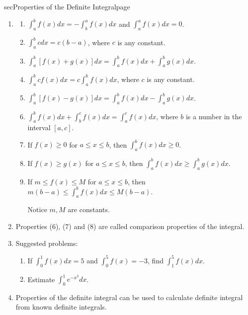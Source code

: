 \documentclass[../main]{subfiles}
\begin{document}
\begin{outline}{sec}{Properties of the Definite Integral}{page} \label{outline:integral-properties}
  \begin{enumerate}
    \item \textbf{}
      \begin{enumerate}[label=(\arabic*), start=0] 
        \item \(\int_{a}^{b} f(x) dx = -\int_{b}^{a} f(x) dx\) and \(\int_{a}^{a}f(x)dx = 0\).
        \item \(\int_{a}^{b} c dx = c(b-a)\), where \(c\) is any constant.
        \item \(\int_{a}^{b} [f(x) + g(x) ] dx = \int_{a}^{b} f(x) dx + \int_{a}^{b} g(x) dx\).
        \item \(\int_{a}^{b} c f(x) dx = c \int_{a}^{b} f(x) dx\), where \(c\) is any constant.
        \item \(\int_{a}^{b} [f(x) - g(x) ] dx = \int_{a}^{b} f(x) dx - \int_{a}^{b} g(x) dx\).
        \item \(\int_{a}^{b} f(x) dx + \int_{b}^{c} f(x) dx = \int_{a}^{c} f(x) dx\), where \(b\) is a number in the interval \([a,c]\).
        \item If \(f(x) \ge 0\) for \(a \le x \le b\), then \(\int_{a}^{b} f(x) dx \ge 0\).
        \item If \(f(x) \ge g(x)\) for \(a \le x \le b\), then \(\int_{a}^{b} f(x) dx \ge \int_{a}^{b} g(x) dx\).
        \item If \(m \le f(x) \le M\) for \(a \le x \le b\), then \(m(b-a) \le \int_{a}^{b} f(x) dx \le M(b-a)\). 

          Notice \(m,M\) are constants.
      \end{enumerate}
    \item Properties (6), (7) and (8) are called comparison properties of the integral.
    \item Suggested problems:
      \begin{enumerate}
        \item If \(\int_{0}^{1} f(x) dx = 5\) and \(\int_{0}^{5} f(x) = -3\), find \(\int_{1}^{5} f(x) dx\).
        \item Estimate \(\int_{0}^{1} e^{-x^{2}} dx\). %
      \end{enumerate}

    \item {Properties of the definite integral can be used to calculate definite integral from known definite integrals.}
  \end{enumerate}
\end{outline}
\end{document}

